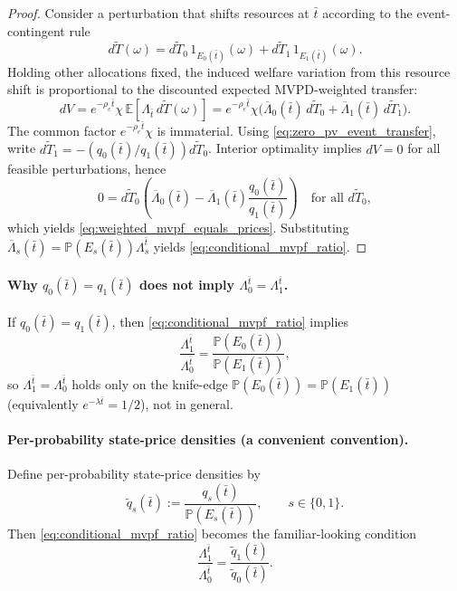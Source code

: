 \documentclass{article}
\begin{document}
\begin{proof}
Consider a perturbation that shifts resources at $\bar t$ according to the event-contingent rule
\[
d\widetilde T(\omega)=d\widetilde T_0\,1_{E_0(\bar t)}(\omega)+d\widetilde T_1\,1_{E_1(\bar t)}(\omega).
\]
Holding other allocations fixed, the induced welfare variation from this resource shift is proportional to the discounted expected MVPD-weighted transfer:
\[
dV = e^{-\rho_e \bar t}\chi\, \mathbb E\!\left[\Lambda_{\bar t}\, d\widetilde T(\omega)\right]
= e^{-\rho_e \bar t}\chi\Big(\overline\Lambda_0(\bar t)\,d\widetilde T_0+\overline\Lambda_1(\bar t)\,d\widetilde T_1\Big).
\]
The common factor $e^{-\rho_e \bar t}\chi$ is immaterial. Using \eqref{eq:zero_pv_event_transfer}, write $d\widetilde T_1=-(q_0(\bar t)/q_1(\bar t))d\widetilde T_0$. Interior optimality implies $dV=0$ for all feasible perturbations, hence
\[
0=d\widetilde T_0\left(\overline\Lambda_0(\bar t)-\overline\Lambda_1(\bar t)\frac{q_0(\bar t)}{q_1(\bar t)}\right)
\quad\text{for all } d\widetilde T_0,
\]
which yields \eqref{eq:weighted_mvpf_equals_prices}. Substituting $\overline\Lambda_s(\bar t)=\mathbb P(E_s(\bar t))\Lambda^{\bar t}_s$ yields \eqref{eq:conditional_mvpf_ratio}.
\end{proof}

\paragraph{Why $q_0(\bar t)=q_1(\bar t)$ does not imply $\Lambda^{\bar t}_0=\Lambda^{\bar t}_1$.}
If $q_0(\bar t)=q_1(\bar t)$, then \eqref{eq:conditional_mvpf_ratio} implies
\[
\frac{\Lambda^{\bar t}_1}{\Lambda^{\bar t}_0}=\frac{\mathbb P(E_0(\bar t))}{\mathbb P(E_1(\bar t))},
\]
so $\Lambda^{\bar t}_1=\Lambda^{\bar t}_0$ holds only on the knife-edge $\mathbb P(E_0(\bar t))=\mathbb P(E_1(\bar t))$ (equivalently $e^{-\lambda \bar t}=1/2$), not in general.

\paragraph{Per-probability state-price densities (a convenient convention).}
Define per-probability state-price densities by
\begin{equation}
\label{eq:per_prob_prices}
\widetilde q_s(\bar t):=\frac{q_s(\bar t)}{\mathbb P(E_s(\bar t))},\qquad s\in\{0,1\}.
\end{equation}
Then \eqref{eq:conditional_mvpf_ratio} becomes the familiar-looking condition
\begin{equation}
\label{eq:mvpf_equals_perprob_prices}
\frac{\Lambda^{\bar t}_1}{\Lambda^{\bar t}_0}=\frac{\widetilde q_1(\bar t)}{\widetilde q_0(\bar t)}.
\end{equation}
\end{document}
